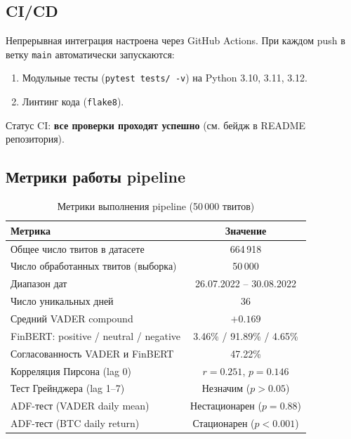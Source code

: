 \documentclass[a4paper,12pt]{article}
\begin{document}
\subsection{CI/CD}

Непрерывная интеграция настроена через GitHub Actions. При каждом push в ветку \texttt{main}
автоматически запускаются:

\begin{enumerate}
  \item Модульные тесты (\texttt{pytest tests/ -v}) на Python 3.10, 3.11, 3.12.
  \item Линтинг кода (\texttt{flake8}).
\end{enumerate}

Статус CI: \textbf{все проверки проходят успешно} (см. бейдж в README репозитория).

\subsection{Метрики работы pipeline}

\begin{table}[H]
\centering
\caption{Метрики выполнения pipeline (50\,000 твитов)}
\label{tab:pipeline_metrics}
\begin{tabular}{|l|c|}
\hline
\textbf{Метрика} & \textbf{Значение} \\
\hline
Общее число твитов в датасете & 664\,918 \\
\hline
Число обработанных твитов (выборка) & 50\,000 \\
\hline
Диапазон дат & 26.07.2022 -- 30.08.2022 \\
\hline
Число уникальных дней & 36 \\
\hline
Средний VADER compound & $+0.169$ \\
\hline
FinBERT: positive / neutral / negative & 3.46\% / 91.89\% / 4.65\% \\
\hline
Согласованность VADER и FinBERT & 47.22\% \\
\hline
Корреляция Пирсона (lag 0) & $r = 0.251$, $p = 0.146$ \\
\hline
Тест Грейнджера (lag 1--7) & Незначим ($p > 0.05$) \\
\hline
ADF-тест (VADER daily mean) & Нестационарен ($p = 0.88$) \\
\hline
ADF-тест (BTC daily return) & Стационарен ($p < 0.001$) \\
\hline
\end{tabular}
\end{table}
\end{document}
